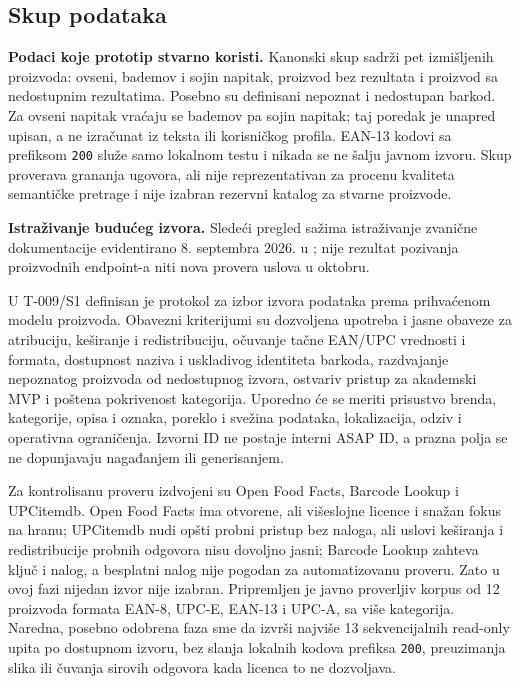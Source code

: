 \documentclass[12pt,a4paper]{article}
\begin{document}
\subsection{Skup podataka}

\textbf{Podaci koje prototip stvarno koristi.} Kanonski skup
 sadrži pet izmišljenih proizvoda: ovseni,
bademov i sojin napitak, proizvod bez rezultata i proizvod sa nedostupnim
rezultatima. Posebno su definisani nepoznat i nedostupan barkod. Za ovseni
napitak vraćaju se bademov pa sojin napitak; taj poredak je unapred upisan,
a ne izračunat iz teksta ili korisničkog profila. EAN-13 kodovi sa prefiksom
\texttt{200} služe samo lokalnom testu i nikada se ne šalju javnom izvoru.
Skup proverava grananja ugovora, ali nije reprezentativan za procenu kvaliteta
semantičke pretrage i nije izabran rezervni katalog za stvarne proizvode.

\textbf{Istraživanje budućeg izvora.} Sledeći pregled sažima istraživanje zvanične dokumentacije evidentirano 8. septembra 2026. u ; nije rezultat pozivanja proizvodnih endpoint-a niti nova provera uslova u oktobru.

U T-009/S1 definisan je protokol za izbor izvora podataka prema prihvaćenom modelu proizvoda. Obavezni kriterijumi su dozvoljena upotreba i jasne obaveze za atribuciju, keširanje i redistribuciju, očuvanje tačne EAN/UPC vrednosti i formata, dostupnost naziva i uskladivog identiteta barkoda, razdvajanje nepoznatog proizvoda od nedostupnog izvora, ostvariv pristup za akademski MVP i poštena pokrivenost kategorija. Uporedno će se meriti prisustvo brenda, kategorije, opisa i oznaka, poreklo i svežina podataka, lokalizacija, odziv i operativna ograničenja. Izvorni ID ne postaje interni ASAP ID, a prazna polja se ne dopunjavaju nagađanjem ili generisanjem.

Za kontrolisanu proveru izdvojeni su Open Food Facts, Barcode Lookup i UPCitemdb. Open Food Facts ima otvorene, ali višeslojne licence i snažan fokus na hranu; UPCitemdb nudi opšti probni pristup bez naloga, ali uslovi keširanja i redistribucije probnih odgovora nisu dovoljno jasni; Barcode Lookup zahteva ključ i nalog, a besplatni nalog nije pogodan za automatizovanu proveru. Zato u ovoj fazi nijedan izvor nije izabran. Pripremljen je javno proverljiv korpus od 12 proizvoda formata EAN-8, UPC-E, EAN-13 i UPC-A, sa više kategorija. Naredna, posebno odobrena faza sme da izvrši najviše 13 sekvencijalnih read-only upita po dostupnom izvoru, bez slanja lokalnih kodova prefiksa \texttt{200}, preuzimanja slika ili čuvanja sirovih odgovora kada licenca to ne dozvoljava.
\end{document}
